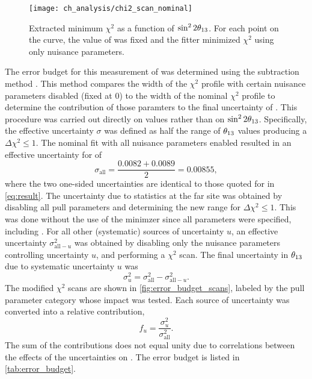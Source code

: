 \begin{figure}
    \centering
    \texttt{[image: ch\_analysis/chi2\_scan\_nominal]}
    \caption[$\chi^2$ scan]{
        Extracted minimum $\chi^2$ as a function of $\sin^22\theta_{13}$.
        For each point on the curve, the value of \thetaot{} was fixed
        and the fitter minimized $\chi^2$
        using only nuisance parameters.
    }
    \label{fig:chi2_scan}
\end{figure}

The error budget for this measurement of \thetaot{}
was determined using the subtraction method \cite{nh2016technote}.
This method compares the width of the $\chi^2$ profile
with certain nuisance parameters disabled (fixed at 0)
to the width of the nominal $\chi^2$ profile
to determine the contribution of those paramters
to the final uncertainty of \thetaot{}.
This procedure was carried out directly on \thetaot{} values
rather than on $\sin^22\theta_{13}$.
Specifically, the effective uncertainty $\sigma$
was defined as half the range of $\theta_{13}$ values
producing a $\Delta \chi^2 \leq 1$.
The nominal fit with all nuisance parameters enabled
resulted in an effective uncertainty for \thetaot{} of
\begin{equation}\label{eq:nominal_unc}
    \sigma_\text{all} = \frac{0.0082 + 0.0089}{2} = 0.00855,
\end{equation}
where the two one-sided uncertainties are identical
to those quoted for \thetaot{} in \cref{eq:result}.
The uncertainty due to statistics at the far site was obtained
by disabling all pull parameters
and determining the new range for $\Delta \chi^2 \leq 1$.
This was done without the use of the minimzer since all parameters were specified,
including \thetaot{}.
For all other (systematic) sources of uncertainty $u$,
an effective uncertainty $\sigma^2_{\text{all}-u}$
was obtained by disabling only the nuisance parameters
controlling uncertainty $u$,
and performing a $\chi^2$ scan.
The final uncertainty in $\theta_{13}$ due to
systematic uncertainty $u$ was
\begin{equation}\label{eq:syst_error_budget}
    \sigma^2_u = \sigma^2_\text{all} - \sigma^2_{\text{all}-u}.
\end{equation}
The modified $\chi^2$ scans are shown in \cref{fig:error_budget_scans},
labeled by the pull parameter category whose impact was tested.
Each source of uncertainty was converted into a relative contribution,
\begin{equation}\label{eq:syst_error_rel}
    f_u = \frac{\sigma^2_u}{\sigma^2_{\text{all}}}.
\end{equation}
The sum of the contributions does not equal unity
due to correlations between the effects of the uncertainties
on \thetaot{}.
The error budget is
listed in \cref{tab:error_budget}.


